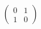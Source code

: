 \documentclass[preview]{standalone}
\begin{document}
\begin{align*}
\begin{pmatrix}0 & 1 \\ 1 & 0\end{pmatrix}
\end{align*}
\end{document}

